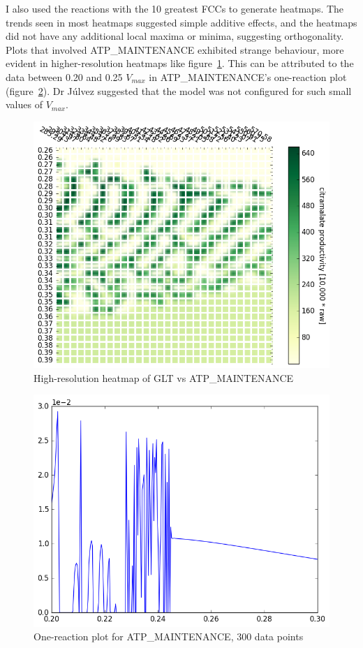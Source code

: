 \documentclass[parskip=full, numbers=noenddot]{scrreprt}
\begin{document}
I also used the reactions with the 10 greatest FCCs to generate heatmaps. The trends seen in most heatmaps suggested simple additive effects, and the heatmaps did not have any additional local maxima or minima, suggesting orthogonality. Plots that involved ATP\_MAINTENANCE exhibited strange behaviour, more evident in higher-resolution heatmaps like figure~\ref{fig:atpmaintenanceheatmap}. This can be attributed to the data between 0.20 and 0.25 $V_{max}$ in ATP\_MAINTENANCE's one-reaction plot (figure~\ref{fig:atpmaintenanceonereac}). Dr J\'ulvez suggested that the model was not configured for such small values of $V_{max}$.

\begin{figure}[htbp]
  \centering
  \includegraphics[scale=0.5]{atpmaintenanceheatmap}
  \caption{High-resolution heatmap of GLT vs ATP\_MAINTENANCE}
  \label{fig:atpmaintenanceheatmap}
\end{figure}

\begin{figure}[htbp]
  \centering
  \includegraphics[scale=0.5]{atpmaintenanceonereac}
  \caption{One-reaction plot for ATP\_MAINTENANCE, 300 data points}
  \label{fig:atpmaintenanceonereac}
\end{figure}
\end{document}
